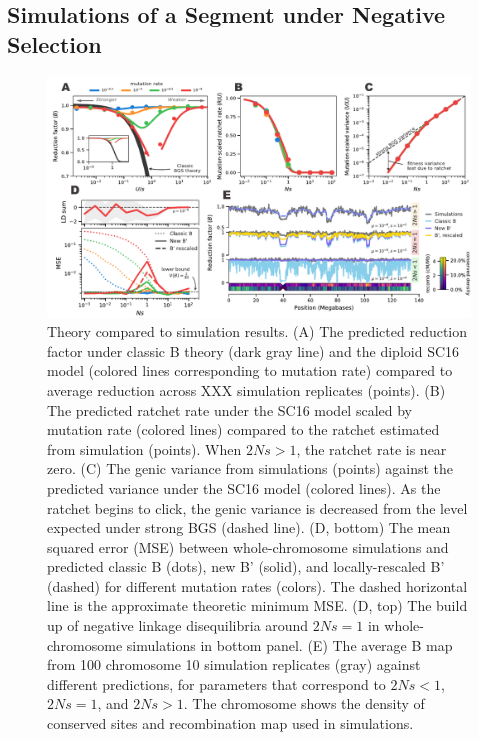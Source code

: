 \documentclass[11pt]{article}
\begin{document}
\subsection*{Simulations of a Segment under Negative Selection}
\label{sec:segment-sims}

\begin{figure}[htbp] \centering
    \includegraphics[width=\textwidth]{figures/figure_1.pdf} \caption{Theory
        compared to simulation results. (A) The predicted reduction factor
        under classic B theory (dark gray line) and the diploid SC16 model
        (colored lines corresponding to mutation rate) compared to average
        reduction across XXX simulation replicates (points). (B) The predicted
        ratchet rate under the SC16 model scaled by mutation rate (colored
        lines) compared to the ratchet estimated from simulation (points). When
        $2Ns>1$, the ratchet rate is near zero. (C) The genic variance from
        simulations (points) against the predicted variance under the SC16
        model (colored lines). As the ratchet begins to click, the genic
        variance is decreased from the level expected under strong BGS (dashed
        line). (D, bottom) The mean squared error (MSE) between
        whole-chromosome simulations and predicted classic B (dots), new B'
        (solid), and locally-rescaled B' (dashed) for different mutation rates
        (colors). The dashed horizontal line is the approximate theoretic
        minimum MSE. (D, top) The build up of negative linkage disequilibria
        around $2Ns=1$ in whole-chromosome simulations in bottom panel. (E) The
        average B map from 100 chromosome 10 simulation replicates (gray)
    against different predictions, for parameters that correspond to $2Ns < 1$,
$2Ns = 1$, and $2Ns > 1$. The chromosome shows the density of conserved sites
and recombination map used in simulations. }
  \label{fig:figure-1}
\end{figure}
\end{document}
